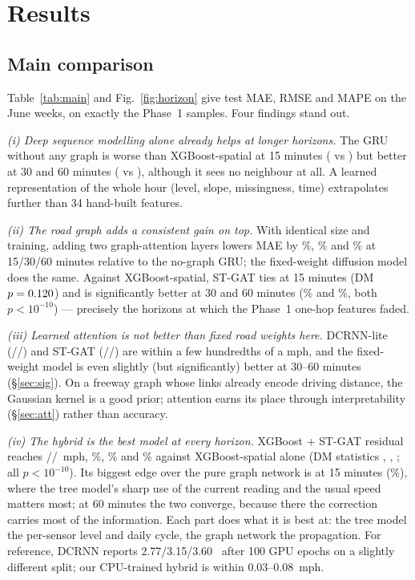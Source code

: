 \section{Results}\label{sec:results}
\subsection{Main comparison}
Table~\ref{tab:main} and Fig.~\ref{fig:horizon} give test MAE, RMSE and MAPE on the June weeks, on exactly the Phase~1 samples. Four findings stand out.

\emph{(i) Deep sequence modelling alone already helps at longer horizons.} The GRU without any graph is worse than XGBoost-spatial at 15 minutes (\pMaeGRUFifteen{} vs \pMaeXGBsFifteen{}) but better at 30 and 60 minutes (\pMaeGRUSixty{} vs \pMaeXGBsSixty{}), although it sees no neighbour at all. A learned representation of the whole hour (level, slope, missingness, time) extrapolates further than 34 hand-built features.

\emph{(ii) The road graph adds a consistent gain on top.} With identical size and training, adding two graph-attention layers lowers MAE by \pRelGatVsGruFifteen\%, \pRelGatVsGruThirty\% and \pRelGatVsGruSixty\% at 15/30/60 minutes relative to the no-graph GRU; the fixed-weight diffusion model does the same. Against XGBoost-spatial, ST-GAT ties at 15 minutes (DM $p=0.120$) and is significantly better at 30 and 60 minutes (\pChgGATThirty\% and \pChgGATSixty\%, both $p<10^{-10}$) --- precisely the horizons at which the Phase~1 one-hop features faded.

\emph{(iii) Learned attention is not better than fixed road weights here.} DCRNN-lite (\pMaeGCNFifteen/\pMaeGCNThirty/\pMaeGCNSixty) and ST-GAT (\pMaeGATFifteen/\pMaeGATThirty/\pMaeGATSixty) are within a few hundredths of a mph, and the fixed-weight model is even slightly (but significantly) better at 30--60 minutes (\S\ref{sec:sig}). On a freeway graph whose links already encode driving distance, the Gaussian kernel is a good prior; attention earns its place through interpretability (\S\ref{sec:att}) rather than accuracy.

\emph{(iv) The hybrid is the best model at every horizon.} XGBoost + ST-GAT residual reaches \pMaeHybFifteen/\pMaeHybThirty/\pMaeHybSixty~mph, \pChgHybFifteen\%, \pChgHybThirty\% and \pChgHybSixty\% against XGBoost-spatial alone (DM statistics \pDmHybFifteen, \pDmHybThirty, \pDmHybSixty; all $p<10^{-10}$). Its biggest edge over the pure graph network is at 15 minutes (\pRelHybVsGatFifteen\%), where the tree model's sharp use of the current reading and the usual speed matters most; at 60 minutes the two converge, because there the correction carries most of the information. Each part does what it is best at: the tree model the per-sensor level and daily cycle, the graph network the propagation. For reference, DCRNN reports 2.77/3.15/3.60~\cite{li2018dcrnn} after 100 GPU epochs on a slightly different split; our CPU-trained hybrid is within 0.03--0.08~mph.


